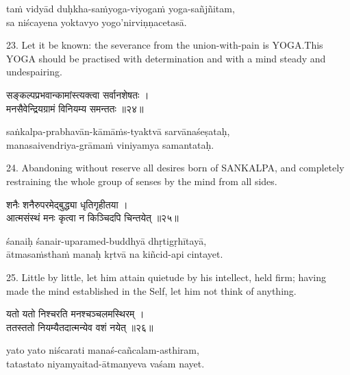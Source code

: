 \begin{transliteration}
taṁ vidyād duḥkha-saṁyoga-viyogaṁ yoga-sañjñitam, \\
sa niścayena yoktavyo yogo'nirviṇṇacetasā.
\end{transliteration}

23. Let it be known: the severance from the union-with-pain is YOGA.\@ This
YOGA should be practised with determination and with a mind steady and
undespairing.

\begin{gitaverse}
सङ्कल्पप्रभवान्कामांस्त्यक्त्वा सर्वानशेषतः । \\
मनसैवेन्द्रियग्रामं विनियम्य समन्ततः ॥२४॥
\end{gitaverse}

\begin{transliteration}
saṅkalpa-prabhavān-kāmāṁs-tyaktvā sarvānaśeṣataḥ, \\
manasaivendriya-grāmaṁ viniyamya samantataḥ.
\end{transliteration}

24. Abandoning without reserve all desires born of SANKALPA, and completely
restraining the whole group of senses by the mind from all sides.

\begin{gitaverse}
शनैः शनैरुपरमेद्बुद्ध्या धृतिगृहीतया । \\
आत्मसंस्थं मनः कृत्वा न किञ्चिदपि चिन्तयेत् ॥२५॥
\end{gitaverse}

\begin{transliteration}
śanaiḥ śanair-uparamed-buddhyā dhṛtigṛhītayā, \\
ātmasaṁsthaṁ manaḥ kṛtvā na kiñcid-api cintayet.
\end{transliteration}

25. Little by little, let him attain quietude by his intellect, held firm;
having made the mind established in the Self, let him not think of anything.

\begin{gitaverse}
यतो यतो निश्चरति मनश्चञ्चलमस्थिरम् । \\
ततस्ततो नियम्यैतदात्मन्येव वशं नयेत् ॥२६॥
\end{gitaverse}

\begin{transliteration}
yato yato niścarati manaś-cañcalam-asthiram, \\
tatastato niyamyaitad-ātmanyeva vaśam nayet.
\end{transliteration}

